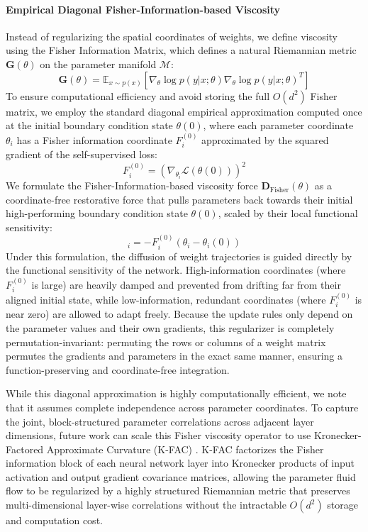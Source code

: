 \paragraph{Empirical Diagonal Fisher-Information-based Viscosity}
Instead of regularizing the spatial coordinates of weights, we define viscosity using the Fisher Information Matrix, which defines a natural Riemannian metric $\mathbf{G}(\theta)$ on the parameter manifold $\mathcal{M}$:
\begin{equation}
    \mathbf{G}(\theta) = \mathbb{E}_{x \sim p(x)} \left[ \nabla_{\theta} \log p(y|x; \theta) \nabla_{\theta} \log p(y|x; \theta)^T \right]
\end{equation}
To ensure computational efficiency and avoid storing the full $O(d^2)$ Fisher matrix, we employ the standard diagonal empirical approximation computed once at the initial boundary condition state $\theta(0)$, where each parameter coordinate $\theta_i$ has a Fisher information coordinate $F_i^{(0)}$ approximated by the squared gradient of the self-supervised loss:
\begin{equation}
    F_i^{(0)} = \left( \nabla_{\theta_i} \mathcal{L}(\theta(0)) \right)^2
\end{equation}
We formulate the Fisher-Information-based viscosity force $\mathbf{D}_{\text{Fisher}}(\theta)$ as a coordinate-free restorative force that pulls parameters back towards their initial high-performing boundary condition state $\theta(0)$, scaled by their local functional sensitivity:
\begin{equation}
    [\mathbf{D}_{\text{Fisher}}(\theta)]_i = - F_i^{(0)} \left( \theta_i - \theta_i(0) \right)
\end{equation}
Under this formulation, the diffusion of weight trajectories is guided directly by the functional sensitivity of the network. High-information coordinates (where $F_i^{(0)}$ is large) are heavily damped and prevented from drifting far from their aligned initial state, while low-information, redundant coordinates (where $F_i^{(0)}$ is near zero) are allowed to adapt freely. Because the update rules only depend on the parameter values and their own gradients, this regularizer is completely permutation-invariant: permuting the rows or columns of a weight matrix permutes the gradients and parameters in the exact same manner, ensuring a function-preserving and coordinate-free integration.

While this diagonal approximation is highly computationally efficient, we note that it assumes complete independence across parameter coordinates. To capture the joint, block-structured parameter correlations across adjacent layer dimensions, future work can scale this Fisher viscosity operator to use Kronecker-Factored Approximate Curvature (K-FAC) \cite{martens2015optimizing}. K-FAC factorizes the Fisher information block of each neural network layer into Kronecker products of input activation and output gradient covariance matrices, allowing the parameter fluid flow to be regularized by a highly structured Riemannian metric that preserves multi-dimensional layer-wise correlations without the intractable $O(d^2)$ storage and computation cost.

